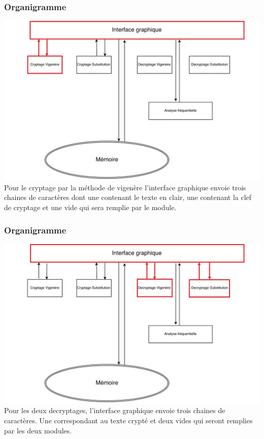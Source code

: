 \documentclass[10pt,xcolor=table]{beamer}
\begin{document}
\begin{frame}
  \frametitle{Organigramme}
\includegraphics[scale = 0.28]{Org8.jpg}\\
Pour le cryptage par la méthode de vigenère l'interface graphique 
envoie trois chaines de caractères dont une contenant le texte 
en clair, une contenant la clef de cryptage et une vide qui sera remplie par 
le module.
\end{frame}
\begin{frame}
  \frametitle{Organigramme}
\includegraphics[scale = 0.28]{Org9.jpg}\\
Pour les deux decryptages, l'interface graphique envoie trois chaines de caractères.
 Une correspondant 
au texte crypté et deux vides qui seront remplies par les deux modules.
\end{frame}
\end{document}
